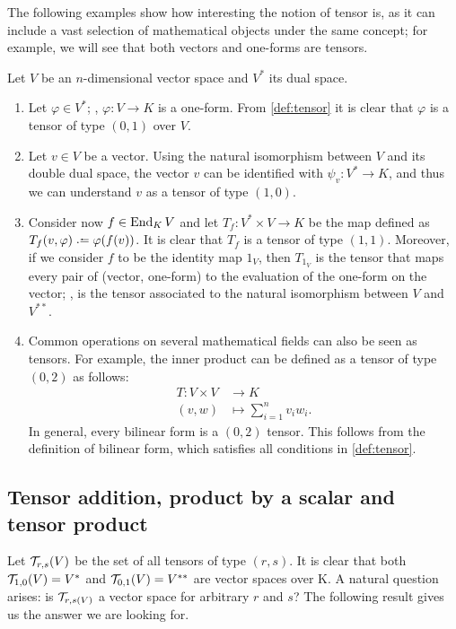 \begin{example}
	\label{ex:tensors}
	The following examples show how interesting the notion of tensor is, as it can include a vast selection of mathematical objects under the same concept; for example, we will see that both vectors and one-forms are tensors.
	
	Let $V$ be an $n$-dimensional vector space and $V^*$ its dual space.
	\begin{enumerate}
		\item Let $\varphi \in V^*$; \ie,  $\varphi \colon V \to K$ is a one-form. From \autoref{def:tensor} it is clear that $\varphi$ is a tensor of type $(0,1)$ over $V$.
		\item Let $v \in V$ be a vector. Using the natural isomorphism between $V$ and its double dual space, the vector $v$ can be identified with $\psi_v \colon V^* \to K$, and thus we can understand $v$ as a tensor of type $(1,0)$.
		\item Consider now $f \in \operatorname{End}_K V$ and let $T_f \colon V^* \times V \to K$ be the map defined as $T_f(v, \varphi) \defeq \varphi(f(v))$. It is clear that $T_f$ is a tensor of type $(1,1)$. Moreover, if we consider $f$ to be the identity map $1_V$, then $T_{1_V}$ is the tensor that maps every pair of (vector, one-form) to the evaluation of the one-form on the vector; \ie, is the tensor associated to the natural isomorphism between $V$ and $V^{**}$.
		\item Common operations on several mathematical fields can also be seen as tensors. For example, the inner product can be defined as a tensor of type $(0,2)$ as follows:
		\begin{align*}
			T \colon V \times V &\to K\\
			(v,w) &\mapsto \sum_{i=1}^n v_i w_i.
		\end{align*}
		In general, every bilinear form is a $(0,2)$ tensor. This follows from the definition of bilinear form, which satisfies all conditions in \autoref{def:tensor}.
	\end{enumerate}
\end{example}

\subsection{Tensor addition, product by a scalar and tensor product}
Let ${\mathcal T}_{r,s}(V)$ be the set of all tensors of type $(r,s)$. It is clear that both ${\mathcal T}_{1,0}(V) = V^*$ and ${\mathcal T}_{0,1}(V) = V^{**}$ are vector spaces over K. A natural question arises: is ${\mathcal T}_{r,s(V)}$ a vector space for arbitrary $r$ and $s$? The following result gives us the answer we are looking for.

